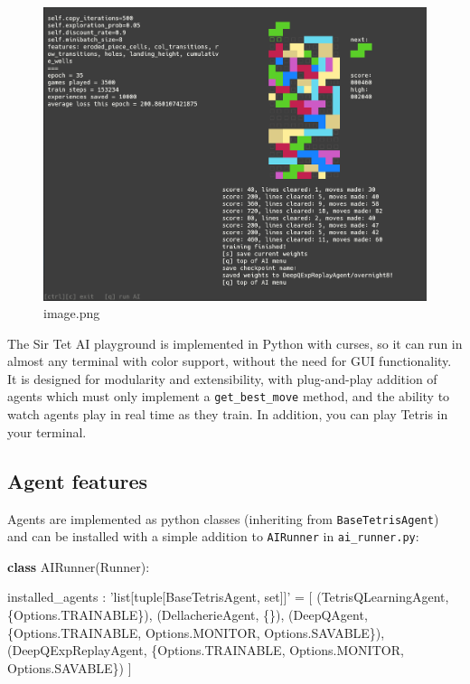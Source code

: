 \documentclass[11pt]{article}
\newenvironment{Shaded}{}{}
\newcommand{\KeywordTok}[1]{\textcolor[rgb]{0.00,0.44,0.13}{\textbf{{#1}}}}
\newcommand{\StringTok}[1]{\textcolor[rgb]{0.25,0.44,0.63}{{#1}}}
\newcommand{\NormalTok}[1]{{#1}}
\newcommand{\OperatorTok}[1]{\textcolor[rgb]{0.40,0.40,0.40}{{#1}}}
\begin{document}
\begin{figure}
\centering
\includegraphics{sirtet_screenshot.png}
\caption{image.png}
\end{figure}

    The Sir Tet AI playground is implemented in Python with curses, so it
can run in almost any terminal with color support, without the need for
GUI functionality. It is designed for modularity and extensibility, with
plug-and-play addition of agents which must only implement a
\texttt{get\_best\_move} method, and the ability to watch agents play in
real time as they train. In addition, you can play Tetris in your
terminal.

\hypertarget{agent-features}{%
\subsection{Agent features}\label{agent-features}}

Agents are implemented as python classes (inheriting from
\texttt{BaseTetrisAgent}) and can be installed with a simple addition to
\texttt{AIRunner} in \texttt{ai\_runner.py}:

\begin{Shaded}
\begin{Highlighting}[]
\KeywordTok{class}\NormalTok{ AIRunner(Runner):}
    
\NormalTok{    installed_agents : }\StringTok{'list[tuple[BaseTetrisAgent, set]]'} \OperatorTok{=}\NormalTok{ [}
\NormalTok{        (TetrisQLearningAgent,  \{Options.TRAINABLE\}),}
\NormalTok{        (DellacherieAgent,      \{\}),}
\NormalTok{        (DeepQAgent,            \{Options.TRAINABLE, Options.MONITOR, Options.SAVABLE\}),}
\NormalTok{        (DeepQExpReplayAgent,   \{Options.TRAINABLE, Options.MONITOR, Options.SAVABLE\})}
\NormalTok{    ]}
\end{Highlighting}
\end{Shaded}
\end{document}

